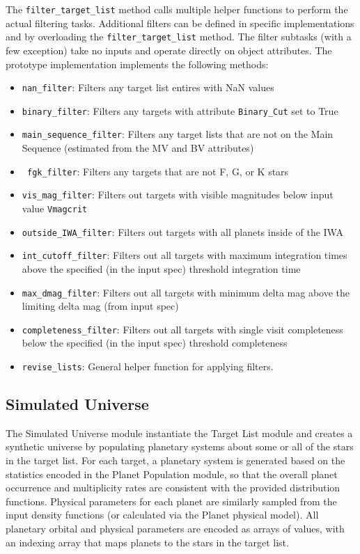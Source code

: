 \documentclass[cleanfoot]{asme2ej}
\begin{document}
The \verb+filter_target_list+ method calls multiple helper functions to perform the actual filtering tasks.  Additional filters can be defined in specific implementations and by overloading the  \verb+filter_target_list+ method.  The filter subtasks (with a few exception) take no inputs and operate directly on object attributes. The prototype implementation implements the following methods:
\begin{itemize}
\item \verb+nan_filter+: Filters any target list entires with NaN values
\item \verb+binary_filter+: Filters any targets with attribute \verb+Binary_Cut+ set to True
\item \verb+main_sequence_filter+: Filters any target lists that are not on the Main Sequence (estimated from the MV and BV attributes)
\item \verb+ fgk_filter+: Filters any targets that are not F, G, or K stars
\item \verb+vis_mag_filter+: Filters out targets with visible magnitudes below input value \verb+Vmagcrit+
\item \verb+outside_IWA_filter+: Filters out targets with all planets inside of the IWA
\item \verb+int_cutoff_filter+: Filters out all targets with maximum integration times above the specified (in the input spec) threshold integration time
\item \verb+max_dmag_filter+: Filters out all targets with minimum delta mag above the limiting delta mag (from input spec)
\item \verb+completeness_filter+: Filters out all targets with single visit completeness below the specified (in the input spec) threshold completeness
\item \verb+revise_lists+: General helper function for applying filters.
\end{itemize}



\subsection{Simulated Universe} \label{sec:simulateduniverse}
The Simulated Universe module instantiate the Target List module and creates a synthetic universe by populating planetary systems about some or all of the stars in the target list.  For each target, a planetary system is generated based on the statistics encoded in the Planet Population module, so that the overall planet occurrence and multiplicity rates are consistent with the provided distribution functions.  Physical parameters for each planet are similarly sampled from the input density functions (or calculated via the Planet physical model).  All planetary orbital and physical parameters are encoded as arrays of values, with an indexing array that maps planets to the stars in the target list. 
\end{document}
